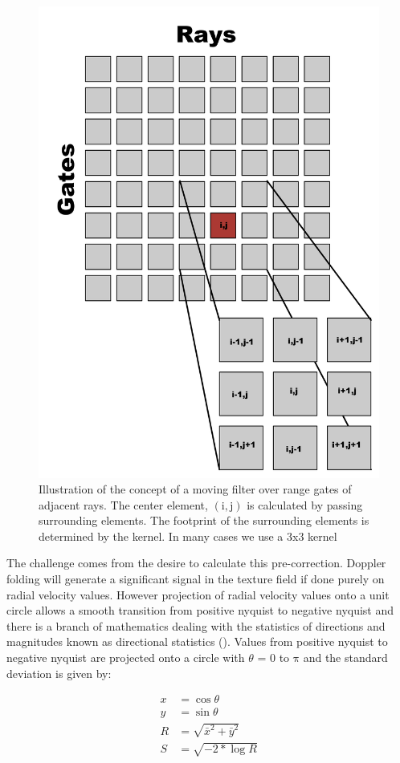 \documentclass[twocol]{ametsoc}
\begin{document}
\begin{figure}[h]
    \centering
    \includegraphics[width=0.8\columnwidth]{grid.png}
    \caption{Illustration of the concept of a moving filter over range gates of adjacent rays. 
    The center element, $\mathrm{(i,j)}$ is calculated by passing surrounding elements. 
    The footprint of the surrounding elements is determined by the kernel. In many cases we use a 3x3 kernel}
    \label{fig:grid}
\end{figure}

The challenge comes from the desire to calculate this pre-correction. Doppler folding will generate a 
significant signal in the texture field if done purely on radial velocity values. However projection of radial 
velocity values onto a unit circle allows a smooth transition from positive nyquist to negative nyquist 
and there is a branch of mathematics dealing with the statistics of directions and magnitudes known
 as directional statistics (\cite{wiki:dstats}). Values from positive nyquist to negative nyquist are projected
  onto a circle with $\theta$ = 0 to $\mathrm{\pi}$ and the standard deviation is given by:

\begin{align}
x &= \cos{\theta}\\
y &= \sin{\theta}\\
R &= \sqrt{\bar{x}^2 + \bar{y}^2}\\ 
S &= \sqrt{-2 * \log{R}}
\label{eq:tex}
\end{align}
\end{document}
